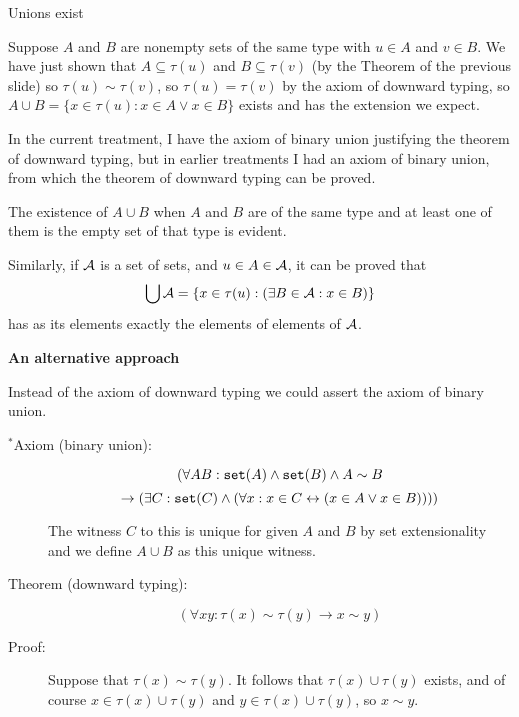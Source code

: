 \documentclass{slides}
\begin{document}
\begin{slide}

{\Large Unions exist}

Suppose $A$ and $B$ are nonempty sets of the same type with $u \in A$ and $v \in B$.  We have just shown that $A \subseteq \tau(u)$ and $B \subseteq \tau(v)$ (by the Theorem of the previous slide) so
$\tau(u) \sim \tau(v)$, so $\tau(u) = \tau(v)$ by the axiom of downward typing, so $A \cup B = \{x \in \tau(u):x \in A \vee x \in B\}$ exists and has the extension we expect.

In the current treatment, I have the axiom of binary union justifying the theorem of downward typing, but in earlier treatments I had an axiom of binary union, from which the theorem of downward typing can be proved.

The existence of $A \cup B$ when $A$ and $B$ are of the same type and at least one of them is the empty set of that type is evident.

Similarly, if $\cal A$ is a set of sets, and $u \in A \in \cal A$, it can be proved that $$\bigcup {\cal A} = \{x \in \tau(u):(\exists B \in {\cal A}:x \in B)\}$$ has as its elements exactly the elements of elements of $\cal A$.


\end{slide}

\begin{slide}

{\bf An alternative approach}

Instead of the axiom of downward typing we could assert the axiom of binary union.

\begin{description}

\item[$^*$Axiom (binary union):]  $$(\forall AB:  {\tt set}(A) \wedge {\tt set}(B) \wedge A \sim B $$ $$\rightarrow (\exists C:{\tt set}(C) \wedge (\forall x:x \in C \leftrightarrow (x \in A \vee x \in B))))$$

The witness $C$ to this is unique for given $A$ and $B$ by set extensionality and we define $A \cup B$ as this unique witness.

\item[Theorem (downward typing):]  $$(\forall xy: \tau(x) \sim \tau(y) \rightarrow x \sim y)$$

\item[Proof:]  Suppose that $\tau(x) \sim \tau(y)$.  It follows that $\tau(x) \cup \tau(y)$ exists, and of course $x \in \tau(x) \cup \tau(y)$ and $y \in \tau(x) \cup \tau(y)$, so $x \sim y$.

\end{description}

\end{slide}
\end{document}
